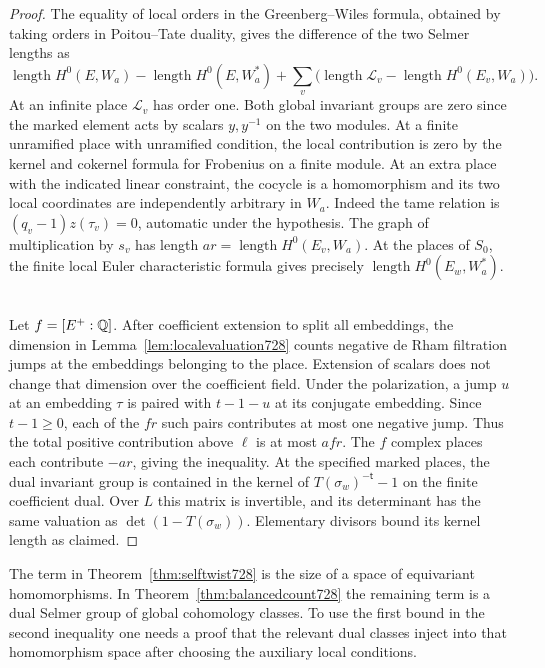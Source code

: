 \documentclass[a4paper,11pt]{article}
\theoremstyle{definition}
\theoremstyle{remark}
\numberwithin{equation}{section}
\begin{document}
\begin{proof}
The equality of local orders in the Greenberg--Wiles formula, obtained
by taking orders in Poitou--Tate duality, gives the difference of the
two Selmer lengths as
\[
   \operatorname{length}H^0(E,W_a)
   -\operatorname{length}H^0(E,W_a^*)
   +\sum_v\bigl(\operatorname{length}\mathcal L_v
                         -\operatorname{length}H^0(E_v,W_a)\bigr).
\]
At an infinite place \(\mathcal L_v\) has order one. Both global
invariant groups are zero since the marked element acts by scalars
\(y,y^{-1}\) on the two modules. At a finite unramified place with
unramified condition, the local contribution is zero by the kernel
and cokernel formula for Frobenius on a finite module. At an extra
place with the indicated linear constraint, the cocycle is a
homomorphism and its two local coordinates are independently arbitrary in \(W_a\).
Indeed the tame relation is \((q_v-1)z(\tau_v)=0\), automatic
under the hypothesis. The graph of multiplication by \(s_v\) has
length \(ar=\operatorname{length}H^0(E_v,W_a)\).
At the places of \(S_0\), the finite local Euler characteristic
formula gives precisely \(\operatorname{length}H^0(E_w,W_a^*)\).
~\cite{II-II-II-duality13}

Let \(f=[E^+:\mathbb Q]\). After coefficient extension to split all embeddings,
the dimension in Lemma~\ref{lem:localevaluation728} counts negative
de Rham filtration jumps at the embeddings belonging to the place.
Extension of scalars does not change that dimension over the
coefficient field. Under the polarization, a jump \(u\) at an
embedding \(\tau\) is paired with \(t-1-u\) at its conjugate
embedding. Since \(t-1\ge0\), each of the \(fr\) such pairs contributes
at most one negative jump. Thus the total positive contribution
above \(\ell\) is at most \(afr\). The \(f\) complex places each
contribute \(-ar\), giving the inequality. At the specified marked
places, the dual invariant group is contained in the kernel of
\(T(\sigma_w)^{-\mathsf t}-1\) on the finite coefficient dual. Over
\(L\) this matrix is invertible, and its determinant has the same
valuation as \(\det(1-T(\sigma_w))\). Elementary divisors bound its
kernel length as claimed.
\end{proof}

The term in Theorem~\ref{thm:selftwist728} is the size of a space of
equivariant homomorphisms. In Theorem~\ref{thm:balancedcount728} the
remaining term is a dual Selmer group of global cohomology classes.
To use the first bound in the second inequality one needs a proof
that the relevant dual classes inject into that homomorphism space
after choosing the auxiliary local conditions.
\clearpage
\end{document}
